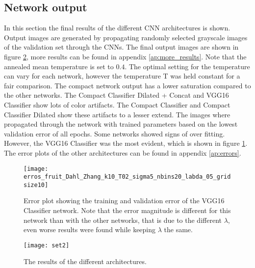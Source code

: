 \subsection{Network output}
In this section the final results of the different CNN architectures is shown. Output images are generated by propagating randomly selected grayscale images of the validation set through the CNNs. The final output images are shown in figure \ref{fig:results}, more results can be found in appendix \ref{ap:more_results}. Note that the annealed mean temperature is set to $0.4$. The optimal setting for the temperature can vary for each network, however the temperature T was held constant for a fair comparison. The compact network output has a lower saturation compared to the other networks. The Compact Classifier Dilated + Concat and VGG16 Classifier show lots of color artifacts. The Compact Classifier and Compact Classifier Dilated show these artifacts to a lesser extend. The images where propagated through the network with trained parameters based on the lowest validation error of all epochs. Some networks showed signs of over fitting. However, the VGG16 Classifier was the most evident, which is shown in figure \ref{fig:overfit}. The error plots of the other architectures can be found in appendix \ref{ap:errors}.
\begin{figure}[h!]
	\centering
	\texttt{[image: erros\_fruit\_Dahl\_Zhang\_k10\_T02\_sigma5\_nbins20\_labda\_05\_gridsize10]}
	\caption{Error plot showing the training and validation error of the VGG16 Classifier network. Note that the error magnitude is different for this network than with the other networks, that is due to the different $\lambda$, even worse results were found while keeping $\lambda$ the same.}
	\label{fig:overfit}
\end{figure}

\clearpage
\begin{figure}[h!]
	\centering
	\texttt{[image: set2]}
	\caption{The results of the different architectures.}
	\label{fig:results}
\end{figure}



